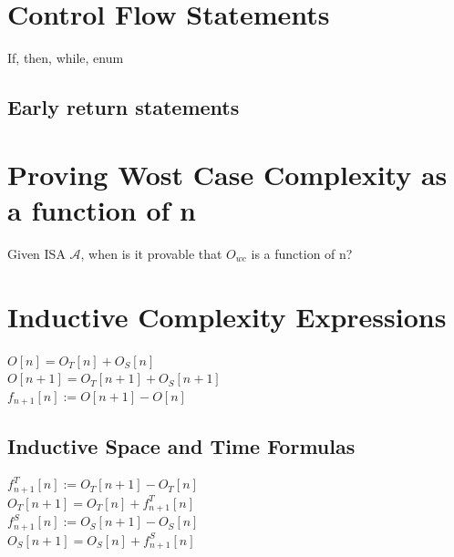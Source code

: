 \documentclass[11pt]{article}
\begin{document}
\section{Control Flow Statements}
If, then, while, enum
\subsection{Early return statements}




\section{Proving Wost Case Complexity as a function of n}
Given ISA $\mathcal{A}$, when is it provable that $O_{wc}$ is a function of n?

\section{Inductive Complexity Expressions}
\begin{center}
\vspace{3mm}
$
O[n] = O_T[n] + O_S[n]
$
\\ \vspace{2mm}
$
O[n+1] = O_T[n+1] + O_S[n+1]
$
\\ \vspace{4mm}
$
f_{n+1}[n] := O[n+1] - O[n]
$
\end{center}










\subsection{Inductive Space and Time Formulas}
\begin{center}
$
f^T_{n+1}[n] := O_T[n+1] - O_T[n]
$
\\ \vspace{2mm}
$
O_T[n+1] = O_T[n] + f^T_{n+1}[n]
$
\\ \vspace{2mm}
$
f^S_{n+1}[n] := O_S[n+1] - O_S[n]
$
\\ \vspace{2mm}
$
O_S[n+1] = O_S[n] + f^S_{n+1}[n]
$

\end{center}
\end{document}
